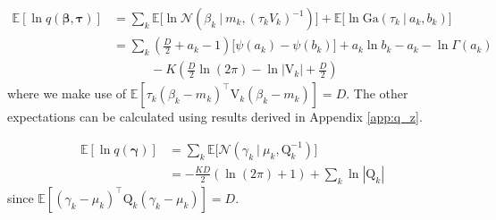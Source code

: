\documentclass[twoside,11pt]{article}
\newcommand\given[1][]{\:#1\vert\:}
\newcommand{\transpose}[1]{#1^{\intercal}}
\newcommand{\ksum}{\sum_{k}}
\newcommand{\boldbeta}{\boldsymbol\beta}
\newcommand{\boldgamma}{\boldsymbol\gamma}
\newcommand{\boldtau}{\boldsymbol\tau}
\newcommand{\E}{\mathbb{E}}
\begin{document}
\begin{equation} \label{eq:e6_deriv} %
\begin{split}
	\E[\ln q(\boldbeta, \boldtau)] &= \ksum \E \Big[ \ln \mathcal{N} \left( \beta_k \given m_k, (\tau_k V_k)^{-1}\right)\Big] + \E\Big[\ln \mathrm{Ga} \left( \tau_k \given a_k, b_k \right)\Big] \\
	&= \ksum \left( \frac{D}{2} + a_k - 1 \right) \big[\psi(a_k) - \psi(b_k) \big] + a_k \ln b_k - a_k - \ln \Gamma(a_k)\\
	& \quad \quad \quad -K \left( \frac{D}{2} \ln(2\pi) - \ln |\mathrm{V}_{k}| + \frac{D}{2}\right)
\end{split}
\end{equation}
where we make use of $\E[\tau_k \transpose{(\beta_k - m_k)}\mathrm{V}_{k}(\beta_k - m_k)] = D$. The other expectations can be calculated using results derived in Appendix \ref{app:q_z}.

\begin{equation} \label{eq:e7_deriv}
\begin{split}
	\E[\ln q(\boldgamma)] &= \ksum \E \Big[ \mathcal{N} \left( \gamma_k \given \mu_k, \mathrm{Q}_{k}^{-1} \right)\Big] \\
	&= - \frac{KD}{2}(\ln (2\pi) + 1) + \sum_{k} \ln|\mathrm{Q}_k| 
\end{split}
\end{equation}
since $\E[\transpose{(\gamma_k - \mu_k)}\mathrm{Q}_{k}(\gamma_k - \mu_k)] = D$.



\vskip 0.2in

\end{document}
